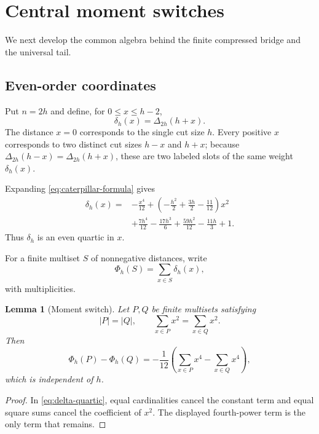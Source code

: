 \documentclass[11pt]{article}
\newtheorem{lemma}[theorem]{Lemma}
\theoremstyle{definition}
\theoremstyle{remark}
\begin{document}
\section{Central moment switches}

We next develop the common algebra behind the finite compressed bridge and the
universal tail.

\subsection{Even-order coordinates}

Put $n=2h$ and define, for $0\le x\le h-2$,
\begin{equation}\label{eq:delta-def}
  \delta_h(x)=\Delta_{2h}(h+x).
\end{equation}
The distance $x=0$ corresponds to the single cut size $h$.  Every positive
$x$ corresponds to two distinct cut sizes $h-x$ and $h+x$; because
$\Delta_{2h}(h-x)=\Delta_{2h}(h+x)$, these are two labeled slots of the same
weight $\delta_h(x)$.

Expanding \eqref{eq:caterpillar-formula} gives
\begin{equation}\label{eq:delta-quartic}
\begin{split}
  \delta_h(x)={}&-\frac{x^4}{12}
  +\left(-\frac{h^2}{2}+\frac{3h}{2}-\frac{11}{12}\right)x^2\\
  &+\frac{7h^4}{12}-\frac{17h^3}{6}
  +\frac{59h^2}{12}-\frac{11h}{3}+1.
\end{split}
\end{equation}
Thus $\delta_h$ is an even quartic in $x$.

For a finite multiset $S$ of nonnegative distances, write
\[
  \Phi_h(S)=\sum_{x\in S}\delta_h(x),
\]
with multiplicities.

\begin{lemma}[Moment switch]\label{lem:moment-switch}
Let $P,Q$ be finite multisets satisfying
\[
  |P|=|Q|,
  \qquad
  \sum_{x\in P}x^2=\sum_{x\in Q}x^2.
\]
Then
\begin{equation}\label{eq:moment-difference}
  \Phi_h(P)-\Phi_h(Q)
  =-\frac1{12}
  \left(\sum_{x\in P}x^4-\sum_{x\in Q}x^4\right),
\end{equation}
which is independent of $h$.
\end{lemma}

\begin{proof}
In \eqref{eq:delta-quartic}, equal cardinalities cancel the constant term and
equal square sums cancel the coefficient of $x^2$.  The displayed fourth-power
term is the only term that remains.
\end{proof}
\end{document}
